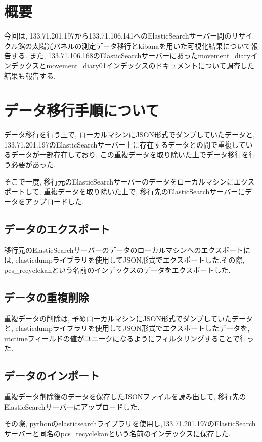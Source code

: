 \section{概要}
今回は, 133.71.201.197から133.71.106.141へのElasticSearchサーバー間のリサイクル館の太陽光パネルの測定データ移行とkibanaを用いた可視化結果について報告する.
また, 133.71.106.168のElasticSearchサーバーにあったmovement\_diaryインデックスとmovement\_diary01インデックスのドキュメントについて調査した結果も報告する.

\section{データ移行手順について}

データ移行を行う上で, ローカルマシンにJSON形式でダンプしていたデータと, 133.71.201.197のElasticSearchサーバー上に存在するデータとの間で重複しているデータが一部存在しており, この重複データを取り除いた上でデータ移行を行う必要があった.

そこで一度, 移行元のElasticSearchサーバーのデータをローカルマシンにエクスポートして, 重複データを取り除いた上で, 移行先のElasticSearchサーバーにデータをアップロードした.

\subsection{データのエクスポート}
移行元のElasticSearchサーバーのデータのローカルマシンへのエクスポートには, elasticdumpライブラリを使用してJSON形式でエクスポートした.その際, pcs\_recyclekanという名前のインデックスのデータをエクスポートした.

\subsection{データの重複削除}
重複データの削除は, 予めローカルマシンにJSON形式でダンプしていたデータと, elasticdumpライブラリを使用してJSON形式でエクスポートしたデータを, utctimeフィールドの値がユニークになるようにフィルタリングすることで行った.

\subsection{データのインポート}
重複データ削除後のデータを保存したJSONファイルを読み出して, 移行先のElasticSearchサーバーにアップロードした.

その際, pythonのelasticsearchライブラリを使用し,133.71.201.197のElasticSearchサーバーと同名のpcs\_recyclekanという名前のインデックスに保存した.


